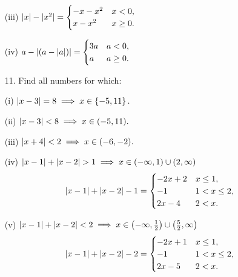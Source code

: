 \documentclass[11pt]{article}
\begin{document}
\begin{enumerate}
    \item[(iii)] $
              \lvert x\rvert - \lvert x^2\rvert =
              \begin{cases}
                  -x - x^2 & x < 0,    \\
                  x - x^2  & x \geq 0.
              \end{cases}
          $

    \item[(iv)] $
              a - \lvert(a - \lvert a\rvert)\rvert =
              \begin{cases}
                  3a & a < 0,    \\
                  a  & a \geq 0.
              \end{cases}
          $

    \item[11.] Find all numbers for which:

    \item[(i)] $
              \lvert x - 3\rvert = 8
              \implies x \in \left\{-5, 11\right\}.
          $

    \item[(ii)] $
              \lvert x - 3\rvert < 8
              \implies x \in (-5, 11).
          $

    \item[(iii)] $
              \lvert x + 4\rvert < 2
              \implies x \in (-6, -2).
          $

    \item[(iv)] $
              \lvert x - 1\rvert + \lvert x - 2\rvert > 1
              \implies
              x \in (-\infty, 1) \cup (2, \infty)
          $
          \[
              \lvert x - 1\rvert + \lvert x - 2\rvert - 1 =
              \begin{cases}
                  -2x + 2 & x \leq 1,     \\
                  -1      & 1 < x \leq 2, \\
                  2x - 4  & 2 < x.
              \end{cases}
          \]

    \item[(v)] $
              \lvert x - 1\rvert + \lvert x - 2\rvert < 2
              \implies x \in
              \left(-\infty, \tfrac{1}{2} \right)
              \cup
              \left(\tfrac{5}{2}, \infty \right)
          $
          \[
              \lvert x - 1\rvert + \lvert x - 2\rvert - 2 =
              \begin{cases}
                  -2x + 1 & x \leq 1,     \\
                  -1      & 1 < x \leq 2, \\
                  2x - 5  & 2 < x.
              \end{cases}
          \]


\end{enumerate}
\end{document}
